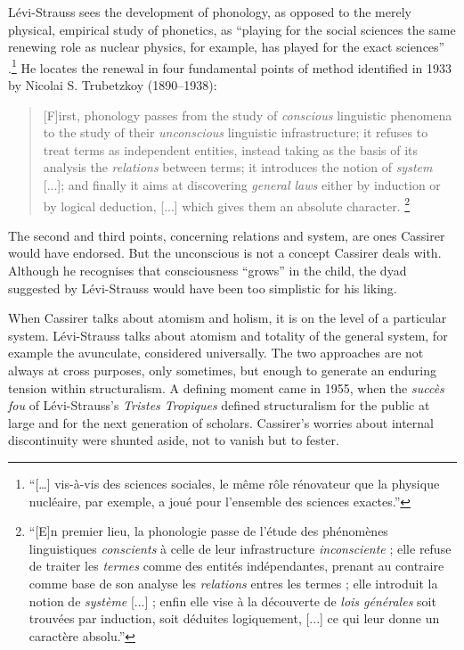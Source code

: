 \documentclass[output=paper]{langscibook}
\begin{document}
Lévi-Strauss sees the development of phonology, as opposed to the merely physical, empirical study of phonetics, as ``playing for the social sciences the same renewing role as nuclear physics, for example, has played for the exact sciences'' \citep[35]{LeviStrauss1945}.\footnote{``[…] vis-à-vis des sciences sociales, le même rôle rénovateur que la physique nucléaire, par exemple, a joué pour l’ensemble des sciences exactes.''} He locates the renewal in four fundamental points of method identified in 1933 by Nicolai S. Trubetzkoy (1890--1938):

\begin{quotation}
[F]irst, phonology passes from the study of \emph{conscious} linguistic phenomena to the study of their \emph{unconscious} linguistic infrastructure; it refuses to treat terms as independent entities, instead taking as the basis of its analysis the \emph{relations} between terms; it introduces the notion of \emph{system} [...]; and finally it aims at discovering \emph{general laws} either by induction or by logical deduction, [...] which gives them an absolute character. \citep[35]{LeviStrauss1945}\footnote{``[E]n premier lieu, la phonologie passe de l’étude des phénomènes linguistiques \emph{conscients} à celle de leur infrastructure \emph{inconsciente} ; elle refuse de traiter les \emph{termes} comme des entités indépendantes, prenant au contraire comme base de son analyse les \emph{relations} entres les termes ; elle introduit la notion de \emph{système} [...] ; enfin elle vise à la découverte de \emph{lois générales} soit trouvées par induction, soit déduites logiquement, [...] ce qui leur donne un caractère absolu.''}
\end{quotation}

The second and third points, concerning relations and system, are ones Cassirer would have endorsed. But the unconscious is not a concept Cassirer deals with. Although he recognises that consciousness ``grows'' in the child, the dyad suggested by Lévi-Strauss would have been too simplistic for his liking.

When Cassirer talks about atomism and holism, it is on the level of a particular system. Lévi-Strauss talks about atomism and totality of the general system, for example the avunculate, considered universally. The two approaches are not always at cross purposes, only sometimes, but enough to generate an enduring tension within structuralism. A defining moment came in 1955, when the \emph{succès fou} of Lévi-Strauss’s \emph{Tristes Tropiques} defined structuralism for the public at large and for the next generation of scholars. Cassirer’s worries about internal discontinuity were shunted aside, not to vanish but to fester.
\end{document}
